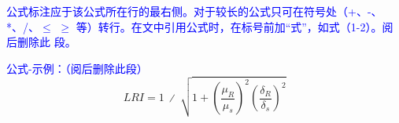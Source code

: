 \textcolor{blue}{公式标注应于该公式所在行的最右侧。对于较长的公式只可在符号处（+、-、*、/、$\leqslant$ $\geqslant$ 等）转行。在文中引用公式时，在标号前加“式”，如式（1-2）。阅后删除此
段。}

\textcolor{blue}{公式-示例：（阅后删除此段）}
\begin{equation}
    LRI=1\ ∕\ \sqrt{1+{\left(\frac{{\mu }_{R}}{{\mu }_{s}}\right)}^{2}{\left(\frac{{\delta }_{R}}{{\delta }_{s}}\right)}^{2}}
\end{equation}
